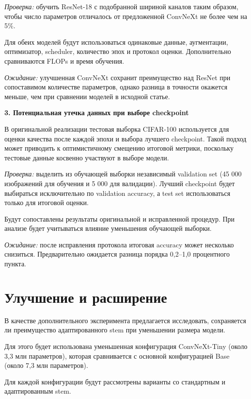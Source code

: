 \documentclass[11pt,a4paper]{article}
\begin{document}
\textit{Проверка:}
обучить ResNet-18 с подобранной шириной каналов таким образом, чтобы число параметров отличалось от предложенной ConvNeXt не более чем на 5\%.

Для обеих моделей будут использоваться одинаковые данные, аугментации, оптимизатор, scheduler, количество эпох и протокол оценки. Дополнительно сравниваются FLOPs и время обучения.

 

\textit{Ожидание:}
улучшенная ConvNeXt сохранит преимущество над ResNet при сопоставимом количестве параметров, однако разница в точности окажется меньше, чем при сравнении моделей в исходной статье. 

\medskip
\textbf{3. Потенциальная утечка данных при выборе checkpoint }

В оригинальной реализации тестовая выборка CIFAR-100 используется для оценки качества после каждой эпохи и выбора лучшего checkpoint. Такой подход может приводить к оптимистичному смещению итоговой метрики, поскольку тестовые данные косвенно участвуют в выборе модели. 

\textit{Проверка:}
выделить из обучающей выборки независимый validation set (45 000 изображений для обучения и 5 000 для валидации). Лучший checkpoint будет выбираться исключительно по validation accuracy, а test set использоваться только для итоговой оценки.

Будут сопоставлены результаты оригинальной и исправленной процедур. При анализе будет учитываться влияние уменьшения обучающей выборки.

 

\textit{Ожидание:}
после исправления протокола итоговая accuracy может несколько снизиться. Предварительно ожидается разница порядка 0,2–1,0 процентного пункта. 

\section{Улучшение и расширение}

В качестве дополнительного эксперимента предлагается исследовать, сохраняется ли преимущество адаптированного stem при уменьшении размера модели.

Для этого будет использована уменьшенная конфигурация ConvNeXt-Tiny (около 3,3 млн параметров), которая сравнивается с основной конфигурацией Base (около 7,3 млн параметров).

Для каждой конфигурации будут рассмотрены варианты со стандартным и адаптированным stem.
\end{document}
